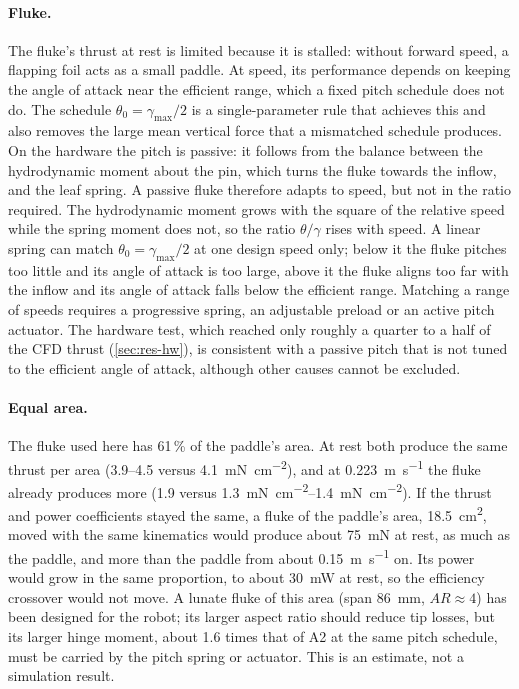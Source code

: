 \paragraph{Fluke.} The fluke's thrust at rest is limited because it is stalled: without forward speed, a flapping foil acts
as a small paddle. At speed, its performance depends on keeping the angle of attack near the efficient range, which a fixed
pitch schedule does not do. The schedule $\theta_0=\gamma_\text{max}/2$ is a single-parameter rule that achieves this and also
removes the large mean vertical force that a mismatched schedule produces. On the hardware the pitch is passive: it follows from
the balance between the hydrodynamic moment about the pin, which turns the fluke towards the inflow, and the leaf spring. A passive
fluke therefore adapts to speed, but not in the ratio required. The hydrodynamic moment grows with the square of the relative speed
while the spring moment does not, so the ratio $\theta/\gamma$ rises with speed. A linear spring can match
$\theta_0=\gamma_\text{max}/2$ at one design speed only; below it the fluke pitches too little and its angle of attack is too large,
above it the fluke aligns too far with the inflow and its angle of attack falls below the efficient range. Matching a range of
speeds requires a progressive spring, an adjustable preload or an active pitch actuator. The hardware test, which reached only
roughly a quarter to a half of the CFD thrust (\cref{sec:res-hw}), is consistent with a passive pitch that is not tuned to the efficient angle of attack, although
other causes cannot be excluded.

\paragraph{Equal area.} The fluke used here has 61\,\% of the paddle's area. At rest both produce the same thrust per area
(\SIrange{3.9}{4.5}{} versus \SI{4.1}{\milli\newton\per\square\centi\metre}), and at \SI{0.223}{\metre\per\second} the fluke already
produces more (\SI{1.9}{} versus \SIrange{1.3}{1.4}{\milli\newton\per\square\centi\metre}). If the thrust and power coefficients stayed
the same, a fluke of the paddle's area, \SI{18.5}{\square\centi\metre}, moved with the same kinematics would produce about
\SI{75}{\milli\newton} at rest, as much as the paddle, and more than the paddle from about \SI{0.15}{\metre\per\second} on. Its power would
grow in the same proportion, to about \SI{30}{\milli\watt} at rest, so the efficiency crossover would not move. A lunate fluke of this area
(span \SI{86}{\milli\metre}, $\mathit{AR}\approx4$) has been designed for the robot; its larger aspect ratio should reduce tip losses, but its
larger hinge moment, about 1.6 times that of A2 at the same pitch schedule, must be carried by the pitch spring or actuator. This is an
estimate, not a simulation result.

